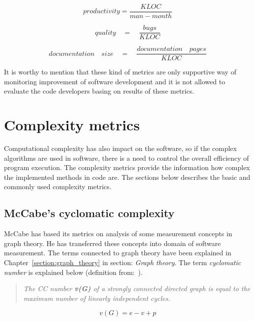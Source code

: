 \begin{equation}
productivity=\frac { KLOC }{ man-month } 
\end{equation}
 
 \begin{equation}
quality\quad =\quad \frac { bugs }{ KLOC } 
\end{equation}

\begin{equation}
documentation\quad size\quad =\quad \frac{documentation\quad pages }{KLOC} 
\end{equation}

It is worthy to mention that these kind of metrics are only supportive way of monitoring improvement of software development and it is not allowed to evaluate the code developers basing on results of these metrics. 

\section{Complexity metrics}

Computational complexity has also impact on the software, so if the complex algorithms are used in software, there is a need to control the overall efficiency of program execution. The complexity metrics provide the information how complex the implemented methods in code are. The sections below describes the basic and commonly used complexity metrics. 
 
\subsection{McCabe's cyclomatic complexity}
McCabe has based its metrics on analysis of some measurement concepts in graph theory. He has  transferred these concepts into domain of software measurement. The terms connected to graph theory have been explained in Chapter~\ref{section:graph_theory} in section: \textit{Graph theory}. The term \textit{cyclomatic number} is explained below (definition from:~\cite{alain}).

\begin{quote}
\textit{The \ac{CC} number \textbf{v(G)} of a strongly connected directed graph is equal to the
maximum number of linearly independent cycles.}
\end{quote}\vspace{-1cm}

\begin{equation}
v(G) = e - v + p
\end{equation}

